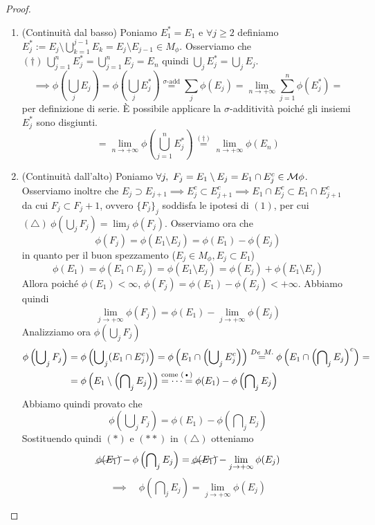 \begin{proof}~
  \begin{enumerate}[label=$(\arabic*)$]
      \item (Continuità dal basso) Poniamo $E_1^*=E_1$ e $\forall j\geq 2$ definiamo $E_j^*:=E_j\setminus \bigcup_{k=1}^{j-1}E_k = E_j \setminus E_{j-1}\in M_\phi$. Osserviamo che $(\dagger)\ \bigcup_{j=1}^nE_j^*=\bigcup_{j=1}^nE_j=E_n$ quindi $\bigcup_jE_j^*=\bigcup_jE_j$.
      \[\implies \phi\left( \bigcup_jE_j\right)=\phi\left( \bigcup_jE_j^* \right) \overset{\sigma\text{-add}}{=} \sum_j\phi(E_j)=\lim_{n\to+\infty}\sum_{j=1}^n\phi(E_j^*) =\]
      per definizione di serie. È possibile applicare la $\sigma$-additività poiché gli insiemi $E_j^*$ sono disgiunti.
      \[=\lim_{n\to+\infty}\phi\left( \bigcup_{j=1}^nE_j^* \right) \overset{(\dagger)}=\lim_{n\to+\infty}\phi(E_n)\]
      \item (Continuità dall'alto) Poniamo $\forall j,\ F_j=E_1\setminus E_j = E_1\cap E_j^c\in \mathcal{M}\phi$. Osserviamo inoltre che $E_{j}\supset E_{j+1} \implies E_j^c\subset E_{j+1}^c \implies E_1\cap E_j^c\subset E_1\cap E_{j+1}^c$ da cui $F_j\subset F_j+1$, ovvero $\{F_j\}_j$ soddisfa le ipotesi di $(1)$, per cui $(\triangle)\ \phi\left( \bigcup_jF_j \right) = \lim_j\phi(F_j)$. Osserviamo ora che
      \[\tag{\textbullet}\phi(F_j)=\phi(E_1\setminus E_j)=\phi(E_1)-\phi(E_j)\]
      in quanto per il buon spezzamento ($E_j\in M_\phi, E_j\subset E_1$)
      \[\phi(E_1)=\phi(E_1\cap E_j)=\phi(E_1\setminus E_j)=\phi(E_j)+\phi(E_1\setminus E_j)\]
      Allora poiché $\phi(E_1)<\infty$, $\phi(F_j)=\phi(E_1)-\phi(E_j)<+\infty$. Abbiamo quindi 
      \[\lim_{j\to+\infty}\phi(F_j)=\phi(E_1)-\lim_{j\to+\infty}\phi(E_j)\tag{$*$}\]
      Analizziamo ora $\phi\left(\bigcup_jF_j\right)$
      \[\begin{aligned}
          \phi\left( \bigcup\nolimits_jF_j \right)&=\phi\left( \bigcup\nolimits_j(E_1\cap E_j^c) \right)= \phi\left(E_1\cap \left( \bigcup\nolimits_jE_j^c \right)\right) \overset{De\ M.}{=} \phi\left( E_1\cap\left( \bigcap\nolimits_jE_j\right)^c \right) =\\&= \phi\left( E_1\setminus \left( \bigcap\nolimits_jE_j \right) \right) \overset{\text{come (\textbullet)}}{=\dots=} \phi(E_1)-\phi\left( \bigcap\nolimits_jE_j \right) 
      \end{aligned}\]
      Abbiamo quindi provato che \[\phi\left( \bigcup\nolimits_jF_j \right) = \phi(E_1)-\phi\left(\bigcap\nolimits_jE_j\right)\tag{$**$}\]
      Sostituendo quindi $(*)$ e $(**)$ in $(\triangle)$ otteniamo 
      \[\cancel{\phi(E_1)}-\phi\left( \bigcap\nolimits_jE_j \right)=\cancel{\phi(E_1)}-\lim_{j\to+\infty}\phi(E_j)\]
      \[\implies\quad \phi\left( \bigcap\nolimits_jE_j \right)=\lim_{j\to+\infty}\phi(E_j)\]
  \end{enumerate}
\end{proof}

